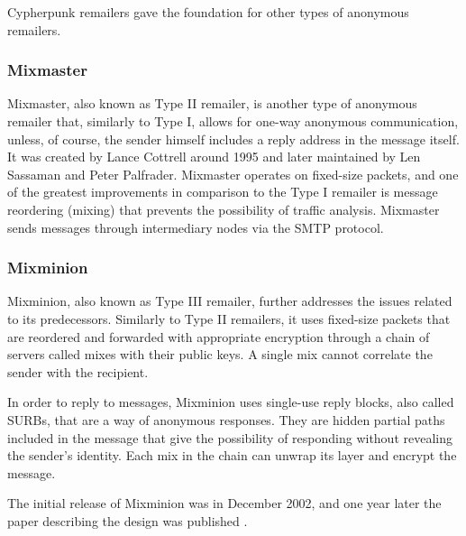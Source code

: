 Cypherpunk remailers gave the foundation for other types of anonymous remailers.

\subsubsection{Mixmaster}
Mixmaster, also known as Type II remailer, is another type of anonymous remailer that, similarly to Type I, allows for one-way anonymous communication, unless, of course, the sender himself includes a reply address in the message itself. It was created by Lance Cottrell around 1995 and later maintained by Len Sassaman and Peter Palfrader. Mixmaster operates on fixed-size packets, and one of the greatest improvements in comparison to the Type I remailer is message reordering (mixing) that prevents the possibility of traffic analysis. Mixmaster sends messages through intermediary nodes via the SMTP protocol.

\subsubsection{Mixminion}
Mixminion, also known as Type III remailer, further addresses the issues related to its predecessors. Similarly to Type II remailers, it uses fixed-size packets that are reordered and forwarded with appropriate encryption through a chain of servers called mixes with their public keys. A single mix cannot correlate the sender with the recipient. 

In order to reply to messages, Mixminion uses single-use reply blocks, also called SURBs, that are a way of anonymous responses. They are hidden partial paths included in the message that give the possibility of responding without revealing the sender’s identity. Each mix in the chain can unwrap its layer and encrypt the message.

The initial release of Mixminion was in December 2002, and one year later the paper describing the design was published \cite{mixminion}.

